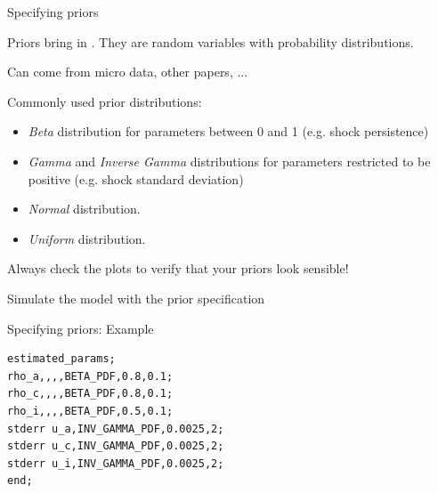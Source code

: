 \begin{frame}{Specifying priors}
\begin{wideitemize}
\item Priors bring in . They are random variables with probability distributions.
\item Can come from micro data, other papers, ...
\item Commonly used prior distributions:
\begin{itemize}
    \item \textit{Beta} distribution for parameters between 0 and 1 (e.g. shock persistence)
    \item \textit{Gamma} and \textit{Inverse Gamma} distributions for parameters restricted to be positive (e.g. shock standard deviation)
    \item \textit{Normal} distribution.
    \item \textit{Uniform} distribution.
\end{itemize}
\item Always check the plots to verify that your priors look sensible!
\item Simulate the model with the prior specification
\end{wideitemize}
\end{frame}

\begin{frame}[fragile]{Specifying priors: Example}
\begin{verbatim}
estimated_params;
rho_a,,,,BETA_PDF,0.8,0.1;
rho_c,,,,BETA_PDF,0.8,0.1;
rho_i,,,,BETA_PDF,0.5,0.1;
stderr u_a,INV_GAMMA_PDF,0.0025,2;
stderr u_c,INV_GAMMA_PDF,0.0025,2;
stderr u_i,INV_GAMMA_PDF,0.0025,2;
end;       
\end{verbatim}
\end{frame}


